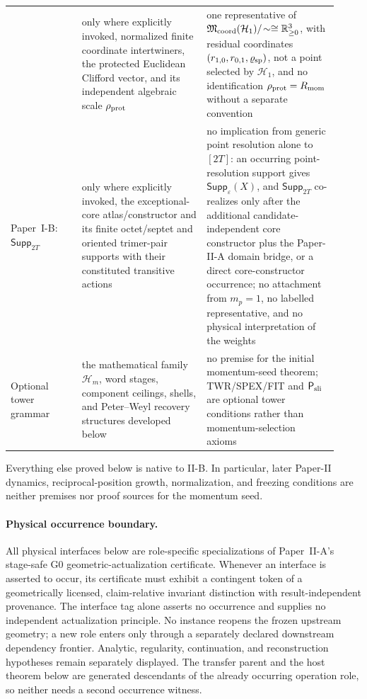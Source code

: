 \documentclass[12pt,a4paper]{article}
\begin{document}
\begin{longtable}{L{0.20\linewidth}L{0.35\linewidth}L{0.37\linewidth}}
& only where explicitly invoked, normalized finite coordinate intertwiners,
the protected Euclidean Clifford vector, and its independent algebraic scale
\(\rho_{\rm prot}\)
& one representative of
\(\mathfrak M_{\rm coord}(\mathcal H_1)/\!\sim\cong\mathbb R_{\ge0}^3\),
with residual coordinates \((r_{1,0},r_{0,1},\varrho_{\rm sp})\), not a point
selected by \(\mathcal H_1\), and no identification
\(\rho_{\rm prot}=R_{\mathrm{mom}}\) without a separate convention \\
Paper~I-B: \(\mathsf{Supp}_{2T}\)
& only where explicitly invoked, the exceptional-core atlas/constructor and
its finite octet/septet and oriented trimer-pair supports with their
constituted transitive actions
& no implication from generic point resolution alone to \([2T]\): an
occurring point-resolution support gives \(\mathsf{Supp}_{\varepsilon}(X)\),
and \(\mathsf{Supp}_{2T}\) co-realizes only after the additional
candidate-independent core constructor plus the Paper-II-A domain bridge, or
a direct core-constructor occurrence; no attachment from \(m_p=1\), no
labelled representative, and no physical interpretation of the weights \\
Optional tower grammar
& the mathematical family \(\mathcal H_m\), word stages, component ceilings,
shells, and Peter--Weyl recovery structures developed below
& no premise for the initial momentum-seed theorem; TWR/SPEX/FIT and
\(\mathsf P_{\rm sli}\) are optional tower conditions rather than
momentum-selection axioms \\
\bottomrule
\end{longtable}
\endgroup
\addtocounter{table}{-1}%
Everything else proved below is native to II-B.  In particular, later
Paper-II dynamics, reciprocal-position growth, normalization, and freezing
conditions are neither premises nor proof sources for the momentum seed.

\paragraph{Physical occurrence boundary.}
All physical interfaces below are role-specific specializations of
Paper~II-A's stage-safe G0 geometric-actualization certificate.  Whenever an
interface is asserted to occur, its certificate must exhibit a contingent
token of a geometrically licensed, claim-relative invariant distinction with
result-independent provenance.  The interface tag alone asserts no occurrence
and supplies no independent actualization principle.  No instance reopens the
frozen upstream geometry; a new role enters only through a separately declared
downstream dependency frontier.  Analytic, regularity, continuation, and
reconstruction hypotheses remain separately displayed.  The transfer parent
and the host theorem below are generated descendants of the already occurring
operation role, so neither needs a second occurrence witness.
\end{document}
